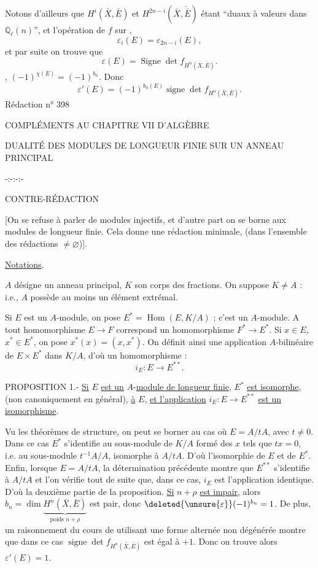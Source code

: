 Notons d'ailleurs que $H^i(\bar X,\bar E)$ et $H^{2n-i}(\bar X,\check{\bar E})$  étant ``duaux à valeurs dans $\mathbb Q_\ell(n)$'', et l'opération de $f$ sur  ,
\[\varepsilon_i(E)=\varepsilon_{2n-i}(E),\]
et par suite on trouve que
\[\boxed{\varepsilon(E)=\operatorname{Signe}\det f_{H^n(\bar X,\bar E)}}.\]
, $(-1)^{\chi(E)}=(-1)^{b_n}$. Donc
\[\varepsilon'(E)=(-1)^{b_n(E)}\operatorname{signe}\det f_{H^n(\bar X,\bar E)}.\]
\hfill Rédaction n° 398
\begin{center}
COMPLÉMENTS AU CHAPITRE VII D'ALGÈBRE

DUALITÉ DES MODULES DE LONGUEUR FINIE SUR UN ANNEAU PRINCIPAL

-:-:-:-

CONTRE-RÉDACTION
\end{center}

[On se refuse à parler de modules injectifs, et d'autre part on se borne aux modules de longueur finie. Cela donne une rédaction minimale, (dans l'ensemble des rédactions $\neq\varnothing$)].

\uline{Notations}.

$A$ désigne un anneau principal, $K$ son corps des fractions. On suppose $K\neq A$ : i.e., $A$ possède au moins un élément extrémal.

Si $E$ est un $A$-module, on pose $E^*=\operatorname{Hom}(E,K/A)$ ; c'est un $A$-module. A tout homomorphisme $E\longrightarrow F$ correspond un homomorphisme $F^*\longrightarrow E^*$. Si $x\in E$, $x^*\in E^*$, on pose $x^*(x)=(x,x^*)$. On définit ainsi une application $A$-bilinéaire de $E\times E^*$ dans $K/A$, d'où un homomorphisme :
\[i_E:E\longrightarrow E^{**}.\]

PROPOSITION 1.- \uline{Si} $E$ \uline{est un} $A$-\uline{module de longueur finie}, $E^*$ \uline{est isomorphe}, (non canoniquement en général), \uline{à} $E$, \uline{et l'application} $i_E:E\longrightarrow E^{**}$ \uline{est un isomorphisme}.

Vu les théorèmes de structure, on peut se borner au cas où $E=A/tA$, avec $t\neq0$. Dans ce cas $E^*$ s'identifie au sous-module de $K/A$ formé des $x$ tels que $tx=0$, i.e. au sous-module $t^{-1}A/A$, isomorphe à $A/tA$. D'où l'isomorphie de $E$ et de $E^*$. Enfin, lorsque $E=A/tA$, la détermination précédente montre que $E^{**}$ s'identifie à $A/tA$ et l'on vérifie tout de suite que, dans ce cas, $i_E$ est l'application identique. D'où la deuxième partie de la proposition.
\uline{Si} $n+\rho$ \uline{est impair}, alors $b_n=\dim\underbrace{H^n(\bar X,\bar E)}_{\text{poids }n+\rho}$ est pair, donc $\deleted{\unsure{\varepsilon}}(-1)^{b_n}=1$. De plus, un raisonnement du cours de  utilisant une forme alternée non dégénérée  montre que dans ce cas $\operatorname{signe}\det f_{H^n(\bar X,\bar E)}$ est égal à $+1$. Donc on trouve alors $\varepsilon'(E)=1$.

